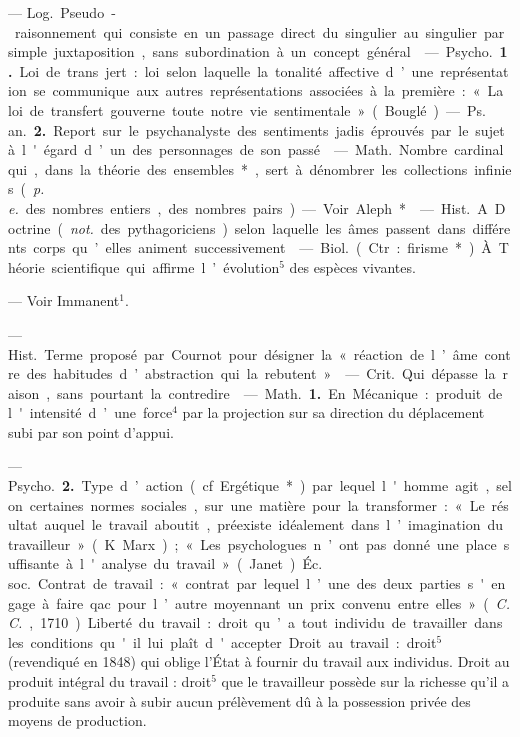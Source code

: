 \begin{itemize}[leftmargin=1cm, label=, itemsep=1pt]
 — \si{Log.} Pseudo-raisonnement qui consiste en un passage
direct du singulier au singulier par
simple juxtaposition, sans subordination à un concept général.

 — \si{Psycho.} {\bf 1.} Loi de trans
jert : loi selon laquelle la tonalité
affective d’une représentation se
communique aux autres représentations associées à la première : « La loi
de transfert gouverne toute notre
vie sentimentale » (Bouglé). —
\si{Ps. an.} {\bf 2.} Report sur le psychanalyste des sentiments jadis éprouvés
par le sujet à l'égard d’un des personnages de son passé.

 — \si{Math.} Nombre
cardinal qui, dans la théorie des
ensembles*, sert à dénombrer les
collections infinies ({\it p. e.} des nombres
entiers, des nombres pairs). — Voir
Aleph*.

 — \si{Hist.}
A. Doctrine ({\it not.} des pythagoriciens) selon laquelle les âmes passent dans différents corps qu’elles
animent successivement.

 — \si{Biol.} (Ctr. : firisme*).
À. Théorie scientifique qui
affirme l’évolution$^5$ des espèces
vivantes.

 — Voir Immanent$^1$.

 — \si{Hist.} Terme
proposé par Cournot pour désigner
la « réaction de l’âme contre des
habitudes d’abstraction qui la rebutent ».

 — \si{Crit.} Qui dépasse
la raison, sans pourtant la contredire.

 — \si{Math.} {\bf 1.} En Mécanique :
produit de l'intensité d’une force$^4$
par la projection sur sa direction
du déplacement subi par son point
d'appui.

— \si{Psycho.} {\bf 2.} Type d’action (cf.
Ergétique*) par lequel l'homme agit,
selon certaines normes sociales, sur
une matière pour la transformer :
« Le résultat auquel le travail aboutit, préexiste idéalement dans l’imagination du travailleur » (K. Marx) ;
« Les psychologues n’ont pas donné
une place suffisante à l'analyse du
travail » (Janet). \si{Éc. soc.} Contrat de
travail : « contrat par lequel l’une
des deux parties s'engage à faire
qac. pour l’autre moyennant un
prix convenu entre elles » ({\it C. C.},
1710). Liberté du travail : droit qu’a
tout individu de travailler dans les
conditions qu'il lui plaît d'accepter.
Droit au travail : droit$^5$ (revendiqué
en 1848) qui oblige l'État à fournir
du travail aux individus. Droit au
produit intégral du travail : droit$^5$
que le travailleur possède sur la
richesse qu’il a produite sans avoir
à subir aucun prélèvement dû à la
possession privée des moyens de
production.


\end{itemize}
